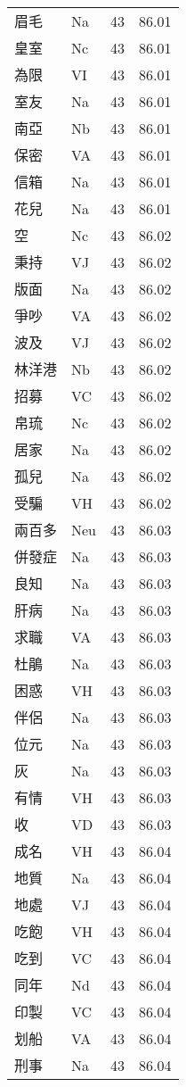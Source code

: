 \documentclass[twocolumn]{book}
\begin{document}
\begin{supertabular}{llrr}
眉毛 & Na & 43 &  86.01\\
皇室 & Nc & 43 &  86.01\\
為限 & VI & 43 &  86.01\\
室友 & Na & 43 &  86.01\\
南亞 & Nb & 43 &  86.01\\
保密 & VA & 43 &  86.01\\
信箱 & Na & 43 &  86.01\\
花兒 & Na & 43 &  86.01\\
空 & Nc & 43 &  86.02\\
秉持 & VJ & 43 &  86.02\\
版面 & Na & 43 &  86.02\\
爭吵 & VA & 43 &  86.02\\
波及 & VJ & 43 &  86.02\\
林洋港 & Nb & 43 &  86.02\\
招募 & VC & 43 &  86.02\\
帛琉 & Nc & 43 &  86.02\\
居家 & Na & 43 &  86.02\\
孤兒 & Na & 43 &  86.02\\
受騙 & VH & 43 &  86.02\\
兩百多 & Neu & 43 &  86.03\\
併發症 & Na & 43 &  86.03\\
良知 & Na & 43 &  86.03\\
肝病 & Na & 43 &  86.03\\
求職 & VA & 43 &  86.03\\
杜鵑 & Na & 43 &  86.03\\
困惑 & VH & 43 &  86.03\\
伴侶 & Na & 43 &  86.03\\
位元 & Na & 43 &  86.03\\
灰 & Na & 43 &  86.03\\
有情 & VH & 43 &  86.03\\
收 & VD & 43 &  86.03\\
成名 & VH & 43 &  86.04\\
地質 & Na & 43 &  86.04\\
地處 & VJ & 43 &  86.04\\
吃飽 & VH & 43 &  86.04\\
吃到 & VC & 43 &  86.04\\
同年 & Nd & 43 &  86.04\\
印製 & VC & 43 &  86.04\\
划船 & VA & 43 &  86.04\\
刑事 & Na & 43 &  86.04\\

\end{supertabular}
\end{document}
